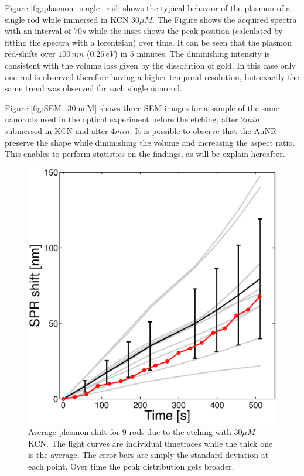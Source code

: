 \documentclass[twocolumn]{article}
\begin{document}
Figure \ref{fig:plasmon_single_rod} shows the typical behavior of the plasmon of
a single rod while immersed in KCN $30\mu M$. The Figure shows the acquired
spectra with an interval of $70s$ while the inset shows the peak position
(calculated by fitting the spectra with a lorentzian) over time. It can be seen
that the plasmon red-shifts over $100\, nm$ ($0.25\, eV$) in $5$ minutes. The
diminishing intensity is consistent with the volume loss given by the
dissolution of gold. In this case only one rod is observed therefore having a
higher temporal resolution, but exactly the same trend was observed for each
single nanorod.



Figure \ref{fig:SEM_30muM} shows three SEM images for a sample of the same
nanorods used in the optical experiment before the etching, after $2min$
submersed in KCN and after $4min$. It is possible to observe that the AuNR
preserve the shape while diminishing the volume and increasing the aspect ratio.
This enables to perform statistics on the findings, as will be explain
hereafter. 


\begin{figure}[htb]
 \centering
 \includegraphics[width=0.9\linewidth]{plasmon_average.eps}
 \caption{Average plasmon shift for 9 rods due to the etching with $30\mu M$
 KCN. The light curves are individual timetraces while the thick one is the
 average. The error bars are simply the standard deviation at each point. Over
 time the peak distribution gets broader.}
 \label{fig:plasmon_average}
\end{figure}
\end{document}
